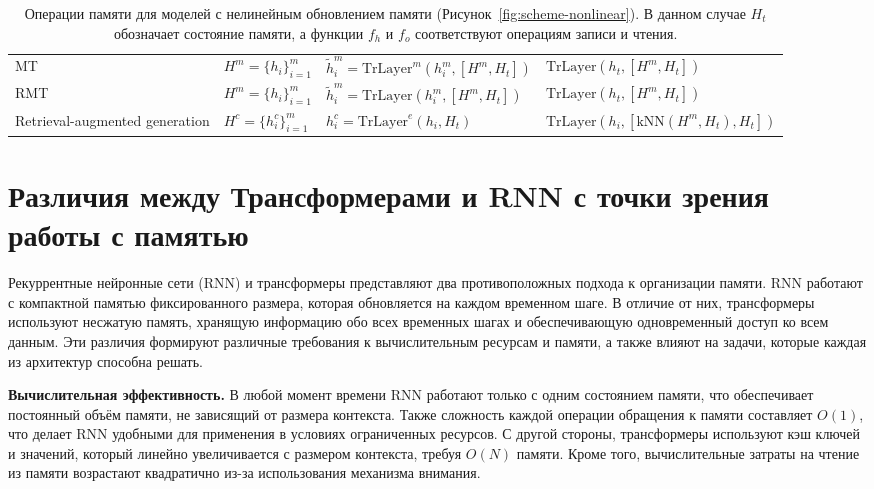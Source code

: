 \begin{table}[t!]
{\begin{tabular}{l lll}
   MT~\cite{burtsev2020memory-transformer} & $H^m = \{h_i\}_{i = 1}^{m}$  &  $\tilde{h}_i^m = \text{TrLayer}^m(h_i^m, [H^m, H_t])$ & $\text{TrLayer}(h_t, [H^m, H_t])$ \\
   RMT~\cite{bulatov2022recurrent} &  $H^m = \{h_i\}_{i = 1}^{m}$  &  $\tilde{h}_i^m = \text{TrLayer}(h_i^m, [H^m, H_t])$ & $\text{TrLayer}(h_t, [H^m, H_t])$ \\
   \midrule
   Retrieval-augmented generation &  $H^c = \{h_i^c\}_{i=1}^m$  &  $h_i^c = \text{TrLayer}^e(h_i, H_t)$ & $\text{TrLayer}(h_i, [\text{kNN}(H^m, H_t), H_t])$ \\
    \bottomrule
\end{tabular}}


\vspace{1mm}
\caption{Операции памяти для моделей с нелинейным обновлением памяти (Рисунок~\ref{fig:scheme-nonlinear}). В данном случае $H_t$ обозначает состояние памяти, а функции $f_h$ и $f_o$ соответствуют операциям записи и чтения.}  
\label{tab:overview-nonlinear}  
\end{table}  


\section{Различия между Трансформерами и RNN с точки зрения работы с памятью}  
\label{sec:differences}  

Рекуррентные нейронные сети (RNN) и трансформеры представляют два противоположных подхода к организации памяти. RNN работают с компактной памятью фиксированного размера, которая обновляется на каждом временном шаге. В отличие от них, трансформеры используют несжатую память, хранящую информацию обо всех временных шагах и обеспечивающую одновременный доступ ко всем данным. Эти различия формируют различные требования к вычислительным ресурсам и памяти, а также влияют на задачи, которые каждая из архитектур способна решать.  

\textbf{Вычислительная эффективность.}
В любой момент времени RNN работают только с одним состоянием памяти, что обеспечивает постоянный объём памяти, не зависящий от размера контекста. Также сложность каждой операции обращения к памяти составляет $O(1)$, что делает RNN удобными для применения в условиях ограниченных ресурсов. С другой стороны, трансформеры используют кэш ключей и значений, который линейно увеличивается с размером контекста, требуя $O(N)$ памяти. Кроме того, вычислительные затраты на чтение из памяти возрастают квадратично из-за использования механизма внимания.  

